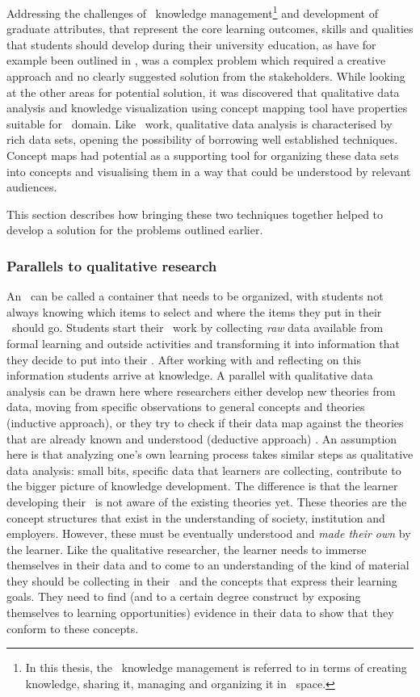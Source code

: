 Addressing the challenges of \ep~knowledge management\footnote{In this thesis,
the \ep~knowledge management is referred to in terms of creating knowledge,
sharing it, managing and organizing it in \ep~space.} and development of
graduate attributes, that represent the core learning outcomes, skills and
qualities that students should develop during their university education, as
have for example been outlined in \citet{Hughes2010}, was a complex problem
which required a creative approach and no clearly suggested solution from the
stakeholders. While looking at the other areas for potential solution, it was
discovered that qualitative data analysis and knowledge visualization using
concept mapping tool have properties suitable for \ep~domain. Like \ep~work,
qualitative data analysis is characterised by rich data sets, opening the
possibility of borrowing well established techniques. Concept maps had potential
as a supporting tool for organizing these data sets into concepts and
visualising them in a way that could be understood by relevant audiences.

This section describes how bringing these two techniques together helped to
develop a solution for the problems outlined earlier.

\subsubsection{Parallels to qualitative research}

An \ep~can be called a container that needs to be organized, with students not
always knowing which items to select and where the items they put in their
\ep~should go. Students start their \ep~work by collecting \textit{raw} data
available from formal learning and outside activities and transforming it into
information that they decide to put into their \ep. After working with and
reflecting on this information students arrive at knowledge. A parallel with
qualitative data analysis can be drawn here where researchers either develop new
theories from data, moving from specific observations to general concepts and
theories (inductive approach), or they try to check if their data map against
the theories that are already known and understood (deductive approach)
\citep{Strauss2008,Patton2002}. An assumption here is that analyzing one's own
learning process takes similar steps as qualitative data analysis: small bits,
specific data that learners are collecting, contribute to the bigger picture of
knowledge development. The difference is that the learner developing their
\ep~is not aware of the existing theories yet. These theories are the concept
structures that exist in the understanding of society, institution and
employers. However, these must be eventually understood and \textit{made their
own} by the learner. Like the qualitative researcher, the learner needs to
immerse themselves in their data and to come to an understanding of the kind of
material they should be collecting in their \ep~and the concepts that express
their learning goals. They need to find (and to a certain degree construct by
exposing themselves to learning opportunities) evidence in their data to show
that they conform to these concepts.

